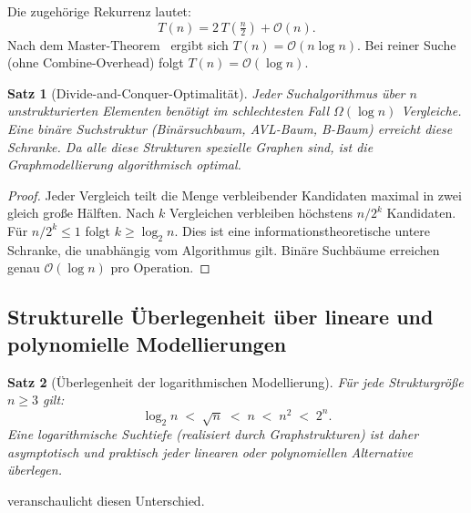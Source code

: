 ﻿\documentclass[12pt,a4paper,twoside]{article}
\theoremstyle{definition}
\theoremstyle{plain}
\newtheorem{theorem}{Satz}[section]
\theoremstyle{remark}
\begin{document}
\noindent
Die zugehörige Rekurrenz lautet:
\[
  T(n) = 2\,T\!\left(\tfrac{n}{2}\right) + \mathcal{O}(n).
\]
Nach dem Master-Theorem~\cite{Cormen2009} ergibt sich
$T(n) = \mathcal{O}(n \log n)$.  Bei reiner Suche (ohne
Combine-Overhead) folgt $T(n)=\mathcal{O}(\log n)$.

\begin{theorem}[Divide-and-Conquer-Optimalität]
\label{thm:dc}
Jeder Suchalgorithmus über $n$ unstrukturierten Elementen
benötigt im schlechtesten Fall $\Omega(\log n)$ Vergleiche.
Eine binäre Suchstruktur (Binärsuchbaum, AVL-Baum, B-Baum)
erreicht diese Schranke.  Da alle diese Strukturen spezielle
Graphen sind, ist die Graphmodellierung algorithmisch optimal.
\end{theorem}

\begin{proof}
Jeder Vergleich teilt die Menge verbleibender Kandidaten maximal
in zwei gleich große Hälften.  Nach $k$ Vergleichen verbleiben
höchstens $n/2^k$ Kandidaten.  Für $n/2^k \leq 1$ folgt
$k \geq \log_2 n$.  Dies ist eine informationstheoretische
untere Schranke, die unabhängig vom Algorithmus gilt.
Binäre Suchbäume erreichen genau $\mathcal{O}(\log n)$ pro
Operation.
\end{proof}

\subsection{Strukturelle Überlegenheit über lineare und
            polynomielle Modellierungen}

\begin{theorem}[Überlegenheit der logarithmischen Modellierung]
\label{thm:superior}
Für jede Strukturgröße $n \geq 3$ gilt:
\[
  \log_2 n \;<\; \sqrt{n} \;<\; n \;<\; n^2 \;<\; 2^n.
\]
Eine logarithmische Suchtiefe (realisiert durch Graphstrukturen)
ist daher asymptotisch und praktisch jeder linearen oder
polynomiellen Alternative überlegen.
\end{theorem}

\noindent
{} veranschaulicht diesen Unterschied.
\end{document}
